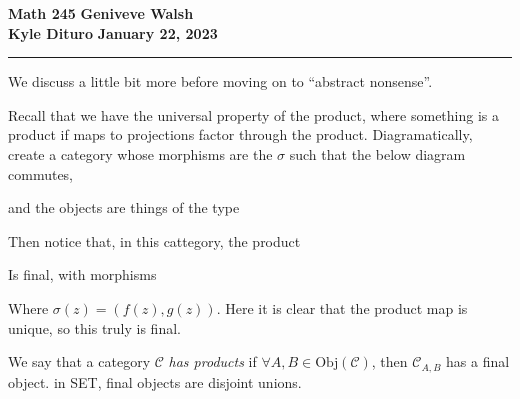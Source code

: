 \documentclass[12pt, twosided]{article}
\begin{document}
\noindent \textbf{Math 245} \hfill \textbf{Geniveve Walsh} \\
\textbf{Kyle Dituro} \hfill \textbf{January 22\ndt, 2023}\hrule
\vspace{.2in}

We discuss a little bit more before moving on to ``abstract nonsense''.

Recall that we have the universal property of the product, where something is a product if maps to projections factor through the product. Diagramatically, create a category whose morphisms are the \(\sigma\) such that the below diagram commutes,

\begin{center}
\end{center}

and the objects are things of the type
\begin{center}
\end{center}

Then notice that, in this cattegory, the product

\begin{center}
\end{center}

Is final, with morphisms

\begin{center}
\end{center}

Where \(\sigma(z) = (f(z), g(z))\). Here it is clear that the product map is unique, so this truly is final.

\begin{df}
  We say that a category \(\mathcal{C}\) \textit{has products} if \(\forall A, B \in \mathrm{Obj}(\mathcal{C})\), then \(\mathcal{C}_{A, B}\) has a final object. in SET, final objects are disjoint unions.
\end{df}
\end{document}
